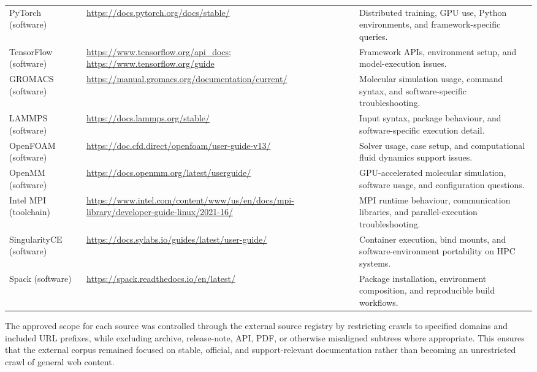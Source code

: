 \begin{longtable}{p{2.5cm} p{4.4cm} p{6.1cm}}
PyTorch (software) &
\url{https://docs.pytorch.org/docs/stable/} &
Distributed training, GPU use, Python environments, and framework-specific queries. \\

TensorFlow (software) &
\url{https://www.tensorflow.org/api_docs}; \url{https://www.tensorflow.org/guide} &
Framework APIs, environment setup, and model-execution issues. \\

GROMACS (software) &
\url{https://manual.gromacs.org/documentation/current/} &
Molecular simulation usage, command syntax, and software-specific troubleshooting. \\

LAMMPS (software) &
\url{https://docs.lammps.org/stable/} &
Input syntax, package behaviour, and software-specific execution detail. \\

OpenFOAM (software) &
\url{https://doc.cfd.direct/openfoam/user-guide-v13/} &
Solver usage, case setup, and computational fluid dynamics support issues. \\

OpenMM (software) &
\url{https://docs.openmm.org/latest/userguide/} &
GPU-accelerated molecular simulation, software usage, and configuration questions. \\

Intel MPI (toolchain) &
\url{https://www.intel.com/content/www/us/en/docs/mpi-library/developer-guide-linux/2021-16/} &
MPI runtime behaviour, communication libraries, and parallel-execution troubleshooting. \\

SingularityCE (software) &
\url{https://docs.sylabs.io/guides/latest/user-guide/} &
Container execution, bind mounts, and software-environment portability on HPC systems. \\

Spack (software) &
\url{https://spack.readthedocs.io/en/latest/} &
Package installation, environment composition, and reproducible build workflows. \\

\end{longtable}
\endgroup

The approved scope for each source was controlled through the external source registry by restricting crawls to specified domains and included URL prefixes, while excluding archive, release-note, API, PDF, or otherwise misaligned subtrees where appropriate. This ensures that the external corpus remained focused on stable, official, and support-relevant documentation rather than becoming an unrestricted crawl of general web content. 
